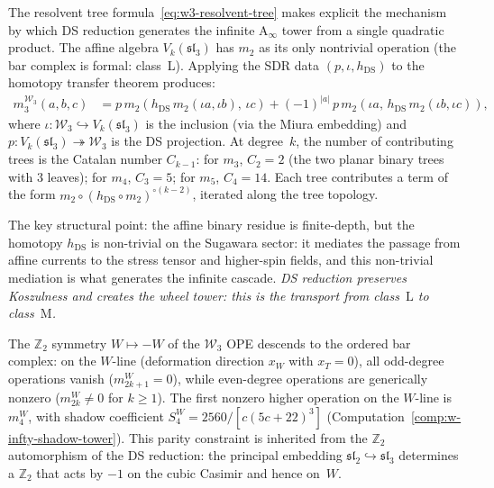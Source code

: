 \begin{remark}
\label{rem:w3-resolvent}
The resolvent tree formula~\eqref{eq:w3-resolvent-tree} makes
explicit the mechanism by which DS reduction generates the infinite
A$_\infty$ tower from a single quadratic product. The affine
algebra $V_k(\mathfrak{sl}_3)$ has $m_2$ as its only nontrivial
operation (the bar complex is formal: class~L). Applying the
SDR data $(p, \iota, h_{\mathrm{DS}})$ to the homotopy transfer
theorem produces:
\begin{align*}
m_3^{\mathcal{W}_3}(a,b,c)
&= p\, m_2(h_{\mathrm{DS}}\, m_2(\iota a, \iota b),\, \iota c)
+ (-1)^{|a|}\,
 p\, m_2(\iota a,\, h_{\mathrm{DS}}\, m_2(\iota b, \iota c)),
\end{align*}
where $\iota\colon \mathcal{W}_3 \hookrightarrow V_k(\mathfrak{sl}_3)$
is the inclusion (via the Miura embedding) and
$p\colon V_k(\mathfrak{sl}_3) \twoheadrightarrow \mathcal{W}_3$
is the DS projection. At degree~$k$, the number of contributing
trees is the Catalan number $C_{k-1}$: for $m_3$, $C_2 = 2$
(the two planar binary trees with $3$ leaves); for $m_4$, $C_3 = 5$;
for $m_5$, $C_4 = 14$. Each tree contributes a term of the form
$m_2 \circ (h_{\mathrm{DS}} \circ m_2)^{\circ (k-2)}$, iterated
along the tree topology.

The key structural point: the affine binary residue is finite-depth,
but the homotopy
$h_{\mathrm{DS}}$ is non-trivial on the Sugawara sector: it
mediates the passage from affine currents to the stress tensor and
higher-spin fields, and this non-trivial mediation is what generates
the infinite cascade. \emph{DS reduction preserves Koszulness and
creates the wheel tower: this is the transport from class~$\mathrm{L}$
to class~$\mathrm{M}$.}
\end{remark}

\begin{remark}
\label{rem:w3-parity-ordered}
The $\mathbb{Z}_2$ symmetry $W \mapsto -W$ of the $\mathcal{W}_3$ OPE
descends to the ordered bar complex: on the $W$-line (deformation
direction $x_W$ with $x_T = 0$), all odd-degree operations vanish
($m_{2k+1}^W = 0$), while even-degree operations are generically nonzero
($m_{2k}^W \neq 0$ for $k \geq 1$). The first nonzero higher
operation on the $W$-line is $m_4^W$, with shadow coefficient
$S_4^W = 2560/[c(5c+22)^3]$
(Computation~\ref{comp:w-infty-shadow-tower}).
This parity constraint
is inherited from the $\mathbb{Z}_2$ automorphism of the DS
reduction: the principal embedding $\mathfrak{sl}_2
\hookrightarrow \mathfrak{sl}_3$ determines a $\mathbb{Z}_2$
that acts by $-1$ on the cubic Casimir and hence on~$W$.
\end{remark}

